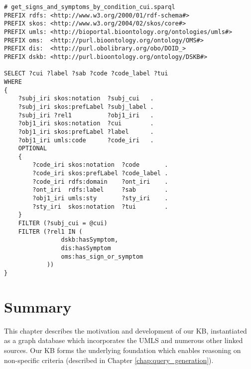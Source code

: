 \documentclass[../main.tex]{subfiles}
\begin{document}
\def\baselinestretch{1.0}    
\begin{lstlisting}
# get_signs_and_symptoms_by_condition_cui.sparql
PREFIX rdfs: <http://www.w3.org/2000/01/rdf-schema#>
PREFIX skos: <http://www.w3.org/2004/02/skos/core#>
PREFIX umls: <http://bioportal.bioontology.org/ontologies/umls#>
PREFIX oms:  <http://purl.bioontology.org/ontology/OMS#>
PREFIX dis:  <http://purl.obolibrary.org/obo/DOID_>
PREFIX dskb: <http://purl.bioontology.org/ontology/DSKB#>

SELECT ?cui ?label ?sab ?code ?code_label ?tui
WHERE 
{
    ?subj_iri skos:notation  ?subj_cui   .
    ?subj_iri skos:prefLabel ?subj_label .
    ?subj_iri ?rel1          ?obj1_iri   .
    ?obj1_iri skos:notation  ?cui        .
    ?obj1_iri skos:prefLabel ?label      .
    ?obj1_iri umls:code      ?code_iri   .
    OPTIONAL
    {
        ?code_iri skos:notation  ?code       .
        ?code_iri skos:prefLabel ?code_label .
        ?code_iri rdfs:domain    ?ont_iri    .
        ?ont_iri  rdfs:label     ?sab        .
        ?obj1_iri umls:sty       ?sty_iri    .
        ?sty_iri  skos:notation  ?tui        .
    }
    FILTER (?subj_cui = @cui) 
    FILTER (?rel1 IN (
                dskb:hasSymptom,
                dis:hasSymptom
                oms:has_sign_or_symptom
            ))
}
\end{lstlisting}
\def\baselinestretch{1.5}    

\section{Summary}

This chapter describes the motivation and development of our KB, instantiated as a graph database which incorporates the UMLS and numerous other linked sources. Our KB forms the underlying foundation which enables reasoning on non-specific criteria (described in Chapter \ref{chap:query_generation}).
\end{document}
